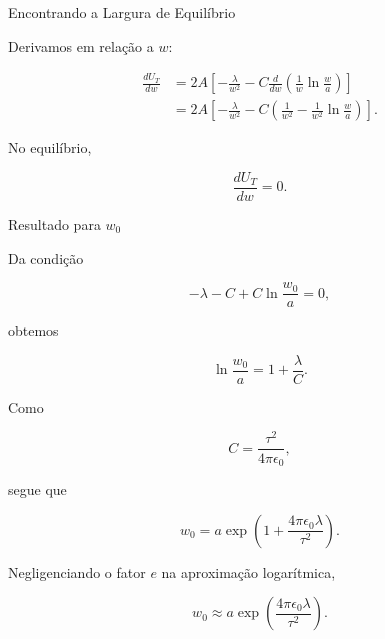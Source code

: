 \documentclass[aspectratio=169]{beamer}
\begin{document}
\begin{frame}{Encontrando a Largura de Equilíbrio}

Derivamos em relação a \(w\):

\begin{align}
\frac{dU_T}{dw}
&=
2A
\left[
-\frac{\lambda}{w^2}
-
C\frac{d}{dw}
\left(
\frac{1}{w}\ln\frac{w}{a}
\right)
\right]
\\[0.2cm]
&=
2A
\left[
-\frac{\lambda}{w^2}
-
C
\left(
\frac{1}{w^2}
-
\frac{1}{w^2}\ln\frac{w}{a}
\right)
\right].
\end{align}

No equilíbrio,

\[
\frac{dU_T}{dw}=0.
\]

\end{frame}

\begin{frame}{Resultado para \(w_0\)}

Da condição

\[
-\lambda
-
C
+
C\ln\frac{w_0}{a}
=
0,
\]

obtemos

\[
\ln\frac{w_0}{a}
=
1+\frac{\lambda}{C}.
\]

Como

\[
C=\frac{\tau^2}{4\pi\epsilon_0},
\]

segue que

\[
w_0
=
a\exp\left(
1+\frac{4\pi\epsilon_0\lambda}{\tau^2}
\right).
\]
\end{frame}

\begin{frame}

Negligenciando o fator \(e\) na aproximação logarítmica,

\begin{eqbox}
\begin{equation}
w_0
\approx
a\exp\left(
\frac{4\pi\epsilon_0\lambda}{\tau^2}
\right).
\tag{4.51}
\label{eq:4.51}
\end{equation}
\end{eqbox}

\end{frame}
\end{document}
